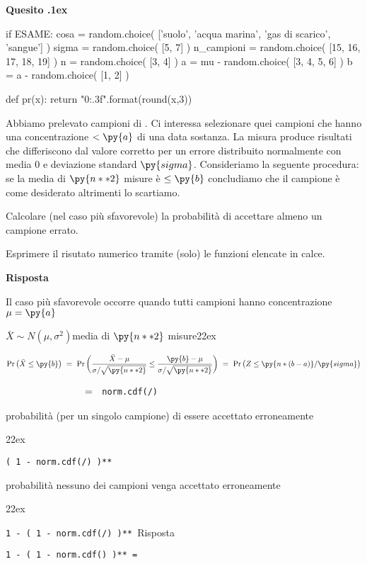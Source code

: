 \documentclass[11pt,twoside,a4paper]{article}
\def\Pr{{\rm Pr\,}}
\newcounter{quesito}
\newenvironment{question}{\addtocounter{quesito}{1}\bigskip\bigskip\par\textbf{Quesito \thequesito.\kern1ex}}{\vspace{\parskip}}
\newenvironment{answer}{\par\textbf{Risposta\quad}}{\vspace{\parskip}}
\begin{document}
\clearpage
\begin{question} %
\begin{pycode}
if ESAME:
    cosa = random.choice( ['suolo', 'acqua marina', 'gas di scarico', 'sangue'] )
    sigma = random.choice( [5, 7] )
    n_campioni = random.choice( [15, 16, 17, 18, 19] )
    n = random.choice( [3, 4] )
    a = mu - random.choice( [3, 4, 5, 6] )
    b = a - random.choice( [1, 2] )

def pr(x):
    return "{0:.3f}".format(round(x,3))
\end{pycode}
Abbiamo prelevato  campioni di . Ci interessa selezionare quei campioni che hanno una concentrazione $<\py{a}$ di una data sostanza. La misura produce risultati che differiscono dal valore corretto per un errore distribuito normalmente con media $0$ e deviazione standard $\py{sigma}$. Consideriamo la seguente procedura: se la media di $\py{n**2}$ misure è $\le\py{b}$ concludiamo che il campione è come desiderato altrimenti lo scartiamo.

Calcolare (nel caso più sfavorevole) la probabilità di accettare almeno un campione errato.

Esprimere il risutato numerico tramite (solo) le funzioni elencate in calce.
\begin{answer}

Il caso più sfavorevole occorre quando tutti  campioni hanno concentrazione $\mu=\py{a}$ 


$\bar X\sim N(\mu,\sigma^2)$\hfill media di $\py{n**2}$ misure\kern22ex

$\Pr\big(\bar X\le\py{b}\big)\ =\ \Pr\bigg(\dfrac{\bar X-\mu}{\sigma/\sqrt{\py{n**2}}}\le\dfrac{\py{b}-\mu}{\sigma/\sqrt{\py{n**2}}}\bigg)\ =\  \Pr\big(Z\le\py{n * (b-a) } /\py{sigma} \big)$\medskip

$\phantom{\Pr\big(\bar X\le\py{b}\big)}\ =\ ${\tt\ norm.cdf(/)}\hfill\parbox[t]{43ex}{ probabilità (per un singolo campione) di essere accettato erroneamente}\kern22ex\medskip

{\tt\noindent\phantom{1 - }( 1 - norm.cdf(/) )**}\hfill\parbox[t]{43ex}{probabilità nessuno dei  campioni venga accettato erroneamente}\kern22ex\medskip


{\color{blue}\tt 1 - ( 1 - norm.cdf(/) )** }\hfill {\color{blue}Risposta}\medskip

{\tt 1 - ( 1 - norm.cdf() )**\ =\  } 
\end{answer}
\end{question}
\end{document}
